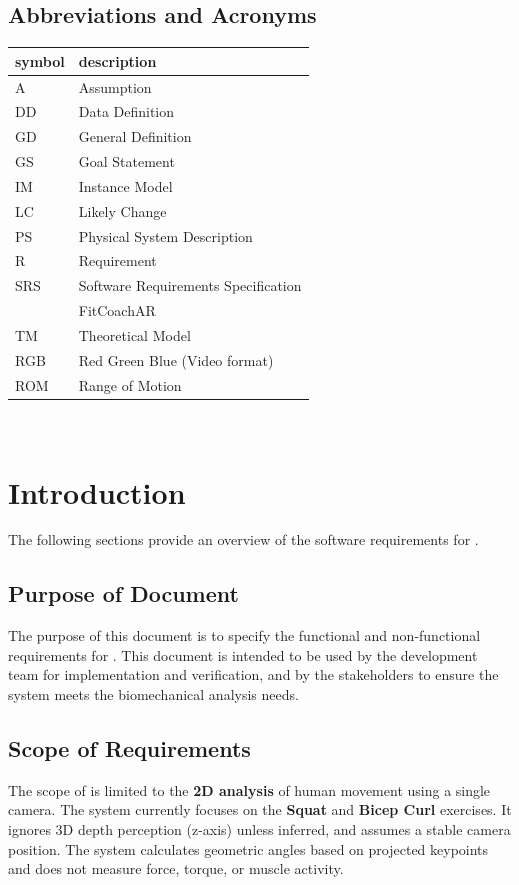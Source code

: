 \documentclass[12pt]{article}
\begin{document}
\subsection{Abbreviations and Acronyms}

\renewcommand{\arraystretch}{1.2}
\begin{tabular}{l l} 
  \toprule		
  \textbf{symbol} & \textbf{description}\\
  \midrule 
  A & Assumption\\
  DD & Data Definition\\
  GD & General Definition\\
  GS & Goal Statement\\
  IM & Instance Model\\
  LC & Likely Change\\
  PS & Physical System Description\\
  R & Requirement\\
  SRS & Software Requirements Specification\\
  \progname{} & FitCoachAR\\
  TM & Theoretical Model\\
  RGB & Red Green Blue (Video format)\\
  ROM & Range of Motion\\
  \bottomrule
\end{tabular}\\



\newpage


\section{Introduction}
The following sections provide an overview of the software requirements for \progname{}.

\subsection{Purpose of Document}
The purpose of this document is to specify the functional and non-functional requirements for \progname{}. This document is intended to be used by the development team for implementation and verification, and by the stakeholders to ensure the system meets the biomechanical analysis needs.

\subsection{Scope of Requirements} 
The scope of \progname{} is limited to the \textbf{2D analysis} of human movement using a single camera. The system currently focuses on the \textbf{Squat} and \textbf{Bicep Curl} exercises. It ignores 3D depth perception (z-axis) unless inferred, and assumes a stable camera position. The system calculates geometric angles based on projected keypoints and does not measure force, torque, or muscle activity.
\end{document}
